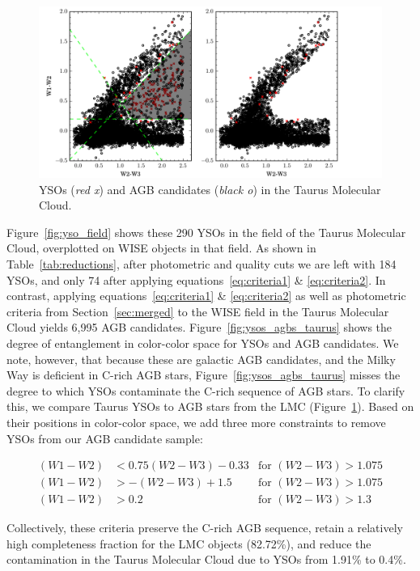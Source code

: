 \begin{figure}[h]
\includegraphics[width=6in]{figs/remove_ysos.pdf}
\caption{YSOs (\emph{red x}) and AGB candidates (\emph{black o}) in the Taurus Molecular Cloud.\label{fig:ysos_lmc}}
\end{figure}

Figure~\ref{fig:yso_field} shows these 290 YSOs in the field of the Taurus Molecular Cloud, overplotted on WISE objects in that field. As shown in Table~\ref{tab:reductions}, after photometric and quality cuts we are left with 184 YSOs, and only 74 after applying equations~\ref{eq:criteria1} \& \ref{eq:criteria2}. In contrast, applying equations~\ref{eq:criteria1} \& \ref{eq:criteria2} as well as photometric criteria from Section~\ref{sec:merged} to the WISE field in the Taurus Molecular Cloud yields 6,995 AGB candidates. Figure~\ref{fig:ysos_agbs_taurus} shows the degree of entanglement in color-color space for YSOs and AGB candidates. We note, however, that because these are galactic AGB candidates, and the Milky Way is deficient in C-rich AGB stars, Figure~\ref{fig:ysos_agbs_taurus} misses the degree to which YSOs contaminate the C-rich sequence of AGB stars. To clarify this, we compare Taurus YSOs to AGB stars from the LMC (Figure~\ref{fig:ysos_lmc}). Based on their positions in color-color space, we add three more constraints to remove YSOs from our AGB candidate sample:

\begin{align}
(W1-W2) &< 0.75(W2-W3) - 0.33 & \text{for } (W2-W3) > 1.075\\
(W1-W2) &> -(W2-W3) + 1.5 & \text{for }(W2-W3) > 1.075\\
(W1-W2) &> 0.2 & \text{for }(W2-W3) > 1.3
\end{align}

Collectively, these criteria preserve the C-rich AGB sequence, retain a relatively high completeness fraction for the LMC objects (82.72\%), and reduce the contamination in the Taurus Molecular Cloud due to YSOs from 1.91\% to 0.4\%.



